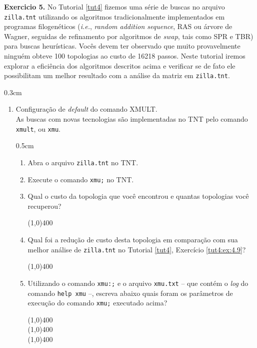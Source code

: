 \begin{refsection}
\begin{blackBlock}{\textbf{Exercicio 5.}}\label{tut4:ex:5.1}
No Tutorial \ref{tut4} fizemos uma série de buscas no arquivo \texttt{zilla.tnt} utilizando os algoritmos tradicionalmente implementados em programas filogenéticos (\textit{i.e.}, \textit{random addition sequence}, RAS ou árvore de Wagner, seguidas de refinamento por algoritmos de \textit{swap}, tais como SPR e TBR) para buscas heurísticas. Vocês devem ter observado que muito provavelmente ninguém obteve 100 topologias ao custo de 16218 passos. Neste tutorial iremos explorar a eficiência dos algoritmos descritos acima e verificar se de fato ele possibilitam um melhor resultado com a análise da matriz em \texttt{zilla.tnt}.
\end{blackBlock}

\begin {myindentpar}{0.3cm}
\begin{enumerate}[\itshape i.]

	\item{Configuração de \textit{default} do comando XMULT.}\\
	As buscas com novas tecnologias são implementadas no TNT pelo comando \texttt{xmult}, ou \texttt{xmu}. 
	  \begin {myindentpar}{0.5cm}
	  \begin{enumerate}[\itshape a.]
		\item{Abra o arquivo \texttt{zilla.tnt} no TNT}.
		\item{Execute o comando \texttt{xmu;} no TNT}.
		\item{Qual o custo da topologia que você encontrou e quantas topologias você recuperou?}
			\begin{center}
			\line(1,0){400}\\
			\end{center}
		\item{Qual foi a redução de custo desta topologia em comparação com sua melhor análise de \texttt{zilla.tnt} no Tutorial \ref{tut4}, Exercício \ref{tut4:ex:4.9}?}
			\begin{center}
			\line(1,0){400}\\
			\end{center}
		\item{Utilizando o comando \texttt{xmu:;} e o arquivo \texttt{xmu.txt} -- que contém o \textit{log} do comando \texttt{help xmu} --, escreva abaixo quais foram os parâmetros de execução do comando \texttt{xmu;} executado acima?}
			\begin{center}
			\line(1,0){400}\\
			\line(1,0){400}\\
			\line(1,0){400}\\
			\end{center}
	  \end{enumerate}
	  \end{myindentpar}


\end{enumerate}
\end{myindentpar}
\end{refsection}
